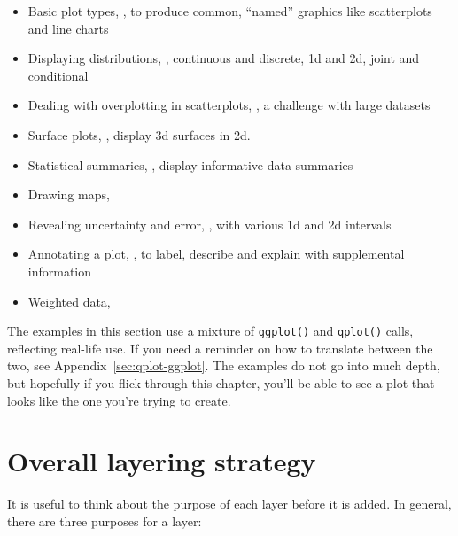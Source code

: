 \begin{itemize}
  \item Basic plot types, , to produce common, ``named'' graphics like scatterplots and line charts
  
  \item Displaying distributions, , continuous and discrete, 1d and 2d, joint and conditional
  
  \item Dealing with overplotting in scatterplots, , a challenge with large datasets

  \item Surface plots, , display 3d surfaces in 2d.

  \item Statistical summaries, , display informative data summaries

  \item Drawing maps, 

  \item Revealing uncertainty and error, , with various 1d and 2d intervals

  \item Annotating a plot, , to label, describe and explain with supplemental information

  \item Weighted data, 
\end{itemize}

The examples in this section use a mixture of {\tt ggplot()} and {\tt qplot()} calls, reflecting real-life use.  If you need a reminder on how to translate between the two, see Appendix~\ref{sec:qplot-ggplot}.  The examples do not go into much depth, but hopefully if you flick through this chapter, you'll be able to see a plot that looks like the one you're trying to create.

\section{Overall layering strategy}
\label{sec:strategy}

It is useful to think about the purpose of each layer before it is added.  In general, there are three purposes for a layer: 

